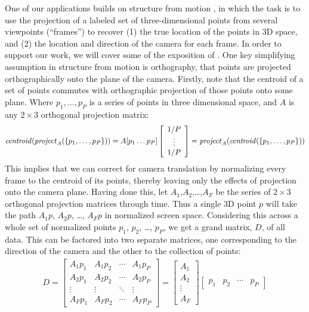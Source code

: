 One of our applications builds on structure from motion \cite{sfmImpl,sfm}, in
which the task is to use the projection of a labeled set of three-dimensional
points from several viewpoints (``frames'') to recover (1) the true location of
the points in 3D space, and (2) the location and direction of the camera for
each frame.  In order to support our work, we will cover some of the exposition
of \cite{sfm}. One key simplifying assumption in structure from motion is
orthography, that points are projected orthographically onto the plane of the
camera.  Firstly, note that the centroid of a set of points commutes with
orthographic projection of those points onto some plane.  Where $p_1, \ldots,
p_P$ is a series of points in three dimensional space, and $A$ is any $2\times
3$ orthogonal projection matrix:
\begin{align}
	{\it centroid}({\it project}_A (\{p_1, \ldots, p_P\})) = A[p_1 \ldots p_P]\left[\begin{array}{c}1/P \\ \vdots \\ 1/P\end{array}\right] ={\it project}_A({\it centroid} (\{p_1, \ldots, p_P\}))
	\end{align}
This implies that we can correct for camera translation by normalizing every
frame to the centroid of its points, thereby leaving only the effects of
projection onto the camera plane.  Having done this, let
$A_1$,$A_2$,\ldots,$A_F$ be the series of $2\times 3$ orthogonal projection
matrices through time.  Thus a single 3D point $p$ will take the path $A_1p$,
$A_2p$, \ldots, $A_Fp$ in normalized screen space.  Considering this across a
whole set of normalized points $p_1$, $p_2$, \ldots, $p_P$, we get a grand
matrix, $D$, of all data.  This can be factored into two separate matrices, one
corresponding to the direction of the camera and the other to the collection of
points:
\begin{align}\label{decomp}
	D=
	\left[ \begin{array}{cccc} 
		A_1p_1 & A_1p_2 & \cdots & A_1p_P \\
		A_2p_1 & A_2p_2 & \cdots & A_2p_P \\
		\vdots & \vdots & \ddots & \vdots \\
		A_Fp_1 & A_Fp_2 & \cdots & A_Fp_P
	\end{array} \right ] = 
	\left[ \begin{array}{c} A_1 \\ A_2 \\ \vdots \\ A_F \end{array} \right ] \left[ \begin{array}{cccc} p_1 & p_2 & \cdots & p_P \end{array} \right ]
	\end{align}
